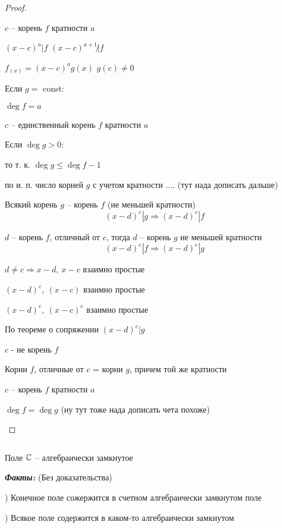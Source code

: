 \begin{proof}
\begin{enumerate}
                \par $c$ -- корень $f$ кратности $a$
                \par $(x - c)^a | f$ \quad $(x - c)^{a + 1} \not | f$
                \par $f_{(x)} = (x - c)^a g(x)$ \quad $g(c) \not = 0$
                \par Если $g =$ const:
                \par \quad $\deg f = a$
                \par \quad $c$ -- единственный корень $f$ кратности $a$
                \par Если $\deg g > 0$:
                \par \quad то т. к. $\deg g \le \deg f - 1$
                \par \quad по и. п. число корней $g$ с учетом кратности .... (тут нада дописать дальше)
                \par Всякий корень $g$ -- корень $f$ (не меньшей кратности)
                \[
                    (x - d)^e | g \Rightarrow (x - d)^e | f    
                \]
                \par $d$ -- корень $f$, отличный от $c$, тогда $d$ -- корень $g$ не меньшей кратности
                \[
                    (x - d)^e | f \Rightarrow (x - d)^e | g    
                \]
                \par $d \not = c \Rightarrow x-d, \ x-c$ взаимно простые
                \par \quad \quad $(x-d)^e, \ (x-c)$ взаимно простые
                \par \quad \quad $(x-d)^e, \ (x-c)^e$ взаимно простые
                \par По теореме о сопряжении $(x-d)^e | g$
                \par \quad $c$ - не корень $f$
                \par Корни $f$, отличные от $c$ = корни $g$, причем той же кратности
                \par $c$ -- корень $f$ кратности $a$
                \par $\deg f = \deg g$ \quad (ну тут тоже нада дописать чета похоже)
        \end{enumerate}
    \end{proof}

    \begin{theorem}
        $ $
        \par Поле $\mathbb{C}$ -- алгебраически замкнутое
    \end{theorem}

    \textit{\textbf{Факты:}} (Без доказательства)
    \par {}) Конечное поле сожержится в счетном алгебраически замкнутом поле
    \par {}) Всякое поле содержится в каком-то алгебраически замкнутом

